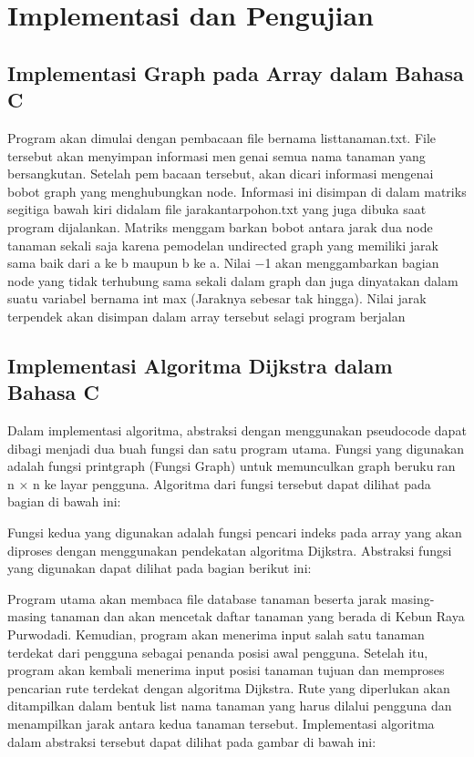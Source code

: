 \documentclass[conference]{IEEEtran}
\begin{document}
\section{Implementasi dan Pengujian}


\subsection{Implementasi Graph pada Array dalam Bahasa C}
Program akan dimulai dengan pembacaan file bernama listtanaman.txt. File tersebut akan menyimpan informasi mengenai semua nama tanaman yang bersangkutan. Setelah pembacaan tersebut, akan dicari informasi mengenai bobot graph yang menghubungkan node. Informasi ini disimpan di dalam matriks segitiga bawah kiri didalam file jarakantarpohon.txt yang juga dibuka saat program dijalankan. Matriks menggambarkan bobot antara jarak dua node tanaman sekali saja karena pemodelan undirected graph yang memiliki jarak sama baik dari a ke b maupun b ke a. Nilai −1 akan menggambarkan bagian node yang tidak terhubung sama sekali dalam graph dan juga dinyatakan dalam suatu variabel bernama int max (Jaraknya sebesar tak hingga). Nilai jarak terpendek akan disimpan dalam array tersebut selagi program berjalan

\subsection{Implementasi Algoritma Dijkstra dalam Bahasa C}
Dalam implementasi algoritma, abstraksi dengan menggunakan pseudocode dapat dibagi menjadi dua buah fungsi dan satu program utama. Fungsi yang digunakan adalah fungsi printgraph (Fungsi Graph) untuk memunculkan graph berukuran n × n ke layar pengguna. Algoritma dari fungsi tersebut dapat dilihat pada bagian di bawah ini:

Fungsi kedua yang digunakan adalah fungsi pencari indeks pada array yang akan diproses dengan menggunakan pendekatan algoritma Dijkstra. Abstraksi fungsi yang digunakan dapat dilihat pada bagian berikut ini:

Program utama akan membaca file database tanaman beserta jarak masing-masing tanaman dan akan mencetak daftar tanaman yang berada di Kebun Raya Purwodadi. Kemudian, program akan menerima input salah satu tanaman terdekat dari pengguna sebagai penanda posisi awal pengguna. Setelah itu, program akan kembali menerima input posisi tanaman tujuan dan memproses pencarian rute terdekat dengan algoritma Dijkstra. Rute yang diperlukan akan ditampilkan dalam bentuk list nama tanaman yang harus dilalui pengguna dan menampilkan jarak antara kedua tanaman tersebut. Implementasi algoritma dalam abstraksi tersebut dapat dilihat pada gambar di bawah ini:
\end{document}
